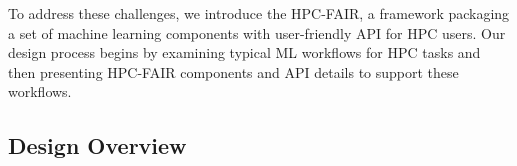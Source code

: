 


To address these challenges, we introduce the HPC-FAIR, a framework packaging a set of machine learning components with user-friendly API for HPC users. %
Our design process begins by examining typical ML workflows for HPC tasks and then presenting HPC-FAIR components and API details to support these workflows.





\subsection{Design Overview}


